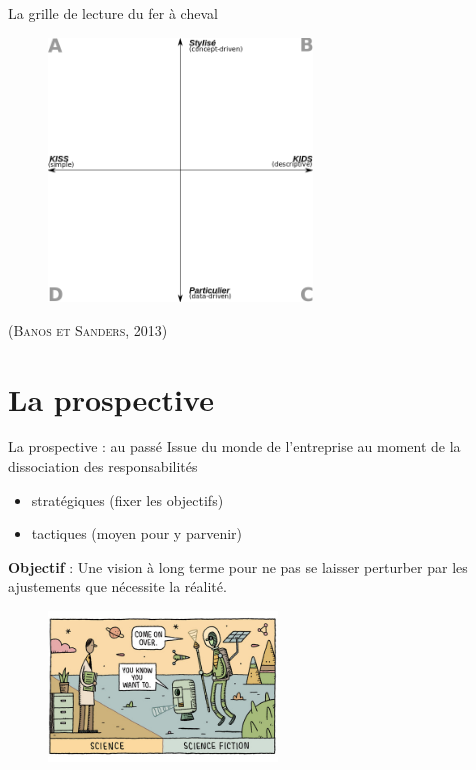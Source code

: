 \documentclass[newPxFont]{beamer}
\begin{document}
\begin{frame}[c]{La grille de lecture du fer à cheval}
  \vspace{-2em}
  \begin{figure}
   \includegraphics[height=7cm]{img/a_banos_sanders.png}
  \end{figure}
  \hspace*{\fill}\textsc{(Banos et Sanders, 2013)}
\end{frame}



%
%
\section{La prospective}

\begin{frame}[c]{La prospective : au passé}
  \vspace{-2em}
  Issue du monde de l'entreprise au moment de la dissociation des responsabilités
  \begin{itemize}
    \item stratégiques (fixer les objectifs)
    \item tactiques (moyen pour y parvenir)
  \end{itemize}
  \textbf{Objectif} : Une vision à long terme pour ne pas se laisser perturber par les ajustements que nécessite la réalité.
  \begin{figure}
   \includegraphics[height=4cm]{img/a_gauld_tom_new_scientist.jpg}
  \end{figure}
\end{frame}
\end{document}
